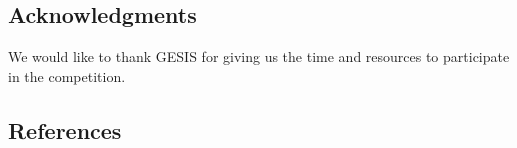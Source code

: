 \subsection{Acknowledgments} 
We would like to thank GESIS for giving us the time and resources to participate in the competition.
\subsection{References} 


